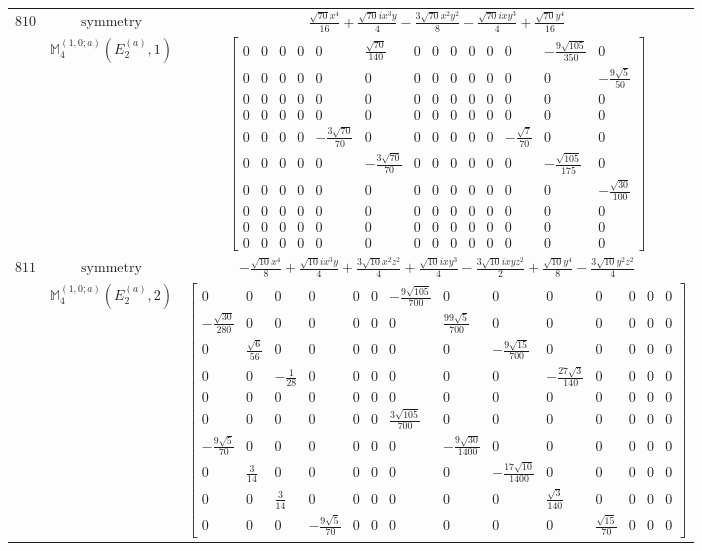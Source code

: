 \documentclass[fleqn,8pt,landscape]{jsarticle}
\begin{document}
\begin{longtable}{ccc}
$ 810 $ & $ \text{symmetry} $ & $ \frac{\sqrt{70} x^{4}}{16} + \frac{\sqrt{70} i x^{3} y}{4} - \frac{3 \sqrt{70} x^{2} y^{2}}{8} - \frac{\sqrt{70} i x y^{3}}{4} + \frac{\sqrt{70} y^{4}}{16} $ \\
$  $ & $ \mathbb{M}_{4}^{(1,0;a)}(E_{2}^{(a)},1) $ & $ \begin{bmatrix} 0 & 0 & 0 & 0 & 0 & \frac{\sqrt{70}}{140} & 0 & 0 & 0 & 0 & 0 & 0 & - \frac{9 \sqrt{105}}{350} & 0 \\ 0 & 0 & 0 & 0 & 0 & 0 & 0 & 0 & 0 & 0 & 0 & 0 & 0 & - \frac{9 \sqrt{5}}{50} \\ 0 & 0 & 0 & 0 & 0 & 0 & 0 & 0 & 0 & 0 & 0 & 0 & 0 & 0 \\ 0 & 0 & 0 & 0 & 0 & 0 & 0 & 0 & 0 & 0 & 0 & 0 & 0 & 0 \\ 0 & 0 & 0 & 0 & - \frac{3 \sqrt{70}}{70} & 0 & 0 & 0 & 0 & 0 & 0 & - \frac{\sqrt{7}}{70} & 0 & 0 \\ 0 & 0 & 0 & 0 & 0 & - \frac{3 \sqrt{70}}{70} & 0 & 0 & 0 & 0 & 0 & 0 & - \frac{\sqrt{105}}{175} & 0 \\ 0 & 0 & 0 & 0 & 0 & 0 & 0 & 0 & 0 & 0 & 0 & 0 & 0 & - \frac{\sqrt{30}}{100} \\ 0 & 0 & 0 & 0 & 0 & 0 & 0 & 0 & 0 & 0 & 0 & 0 & 0 & 0 \\ 0 & 0 & 0 & 0 & 0 & 0 & 0 & 0 & 0 & 0 & 0 & 0 & 0 & 0 \\ 0 & 0 & 0 & 0 & 0 & 0 & 0 & 0 & 0 & 0 & 0 & 0 & 0 & 0 \end{bmatrix} $ \\ \hline
$ 811 $ & $ \text{symmetry} $ & $ - \frac{\sqrt{10} x^{4}}{8} + \frac{\sqrt{10} i x^{3} y}{4} + \frac{3 \sqrt{10} x^{2} z^{2}}{4} + \frac{\sqrt{10} i x y^{3}}{4} - \frac{3 \sqrt{10} i x y z^{2}}{2} + \frac{\sqrt{10} y^{4}}{8} - \frac{3 \sqrt{10} y^{2} z^{2}}{4} $ \\
$  $ & $ \mathbb{M}_{4}^{(1,0;a)}(E_{2}^{(a)},2) $ & $ \begin{bmatrix} 0 & 0 & 0 & 0 & 0 & 0 & - \frac{9 \sqrt{105}}{700} & 0 & 0 & 0 & 0 & 0 & 0 & 0 \\ - \frac{\sqrt{30}}{280} & 0 & 0 & 0 & 0 & 0 & 0 & \frac{99 \sqrt{5}}{700} & 0 & 0 & 0 & 0 & 0 & 0 \\ 0 & \frac{\sqrt{6}}{56} & 0 & 0 & 0 & 0 & 0 & 0 & - \frac{9 \sqrt{15}}{700} & 0 & 0 & 0 & 0 & 0 \\ 0 & 0 & - \frac{1}{28} & 0 & 0 & 0 & 0 & 0 & 0 & - \frac{27 \sqrt{3}}{140} & 0 & 0 & 0 & 0 \\ 0 & 0 & 0 & 0 & 0 & 0 & 0 & 0 & 0 & 0 & 0 & 0 & 0 & 0 \\ 0 & 0 & 0 & 0 & 0 & 0 & \frac{3 \sqrt{105}}{700} & 0 & 0 & 0 & 0 & 0 & 0 & 0 \\ - \frac{9 \sqrt{5}}{70} & 0 & 0 & 0 & 0 & 0 & 0 & - \frac{9 \sqrt{30}}{1400} & 0 & 0 & 0 & 0 & 0 & 0 \\ 0 & \frac{3}{14} & 0 & 0 & 0 & 0 & 0 & 0 & - \frac{17 \sqrt{10}}{1400} & 0 & 0 & 0 & 0 & 0 \\ 0 & 0 & \frac{3}{14} & 0 & 0 & 0 & 0 & 0 & 0 & \frac{\sqrt{3}}{140} & 0 & 0 & 0 & 0 \\ 0 & 0 & 0 & - \frac{9 \sqrt{5}}{70} & 0 & 0 & 0 & 0 & 0 & 0 & \frac{\sqrt{15}}{70} & 0 & 0 & 0 \end{bmatrix} $ \\ \hline

\end{longtable}
\end{document}
